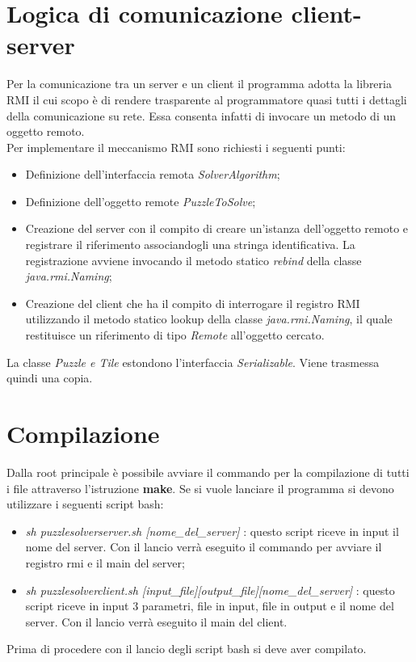 \documentclass[13pt]{article}
\begin{document}
\newpage
\section{Logica di comunicazione client-server}
Per la comunicazione tra un server e un client il programma adotta la libreria RMI il cui scopo è di rendere trasparente al programmatore quasi tutti i dettagli della comunicazione su rete. Essa consenta infatti di invocare un metodo di un oggetto remoto.\\
Per implementare il meccanismo RMI sono richiesti i seguenti punti:
\begin{itemize}
	\item Definizione dell'interfaccia remota \textit{SolverAlgorithm};
	\item Definizione dell'oggetto remote \textit{PuzzleToSolve};
	\item Creazione del server con il compito di creare un'istanza dell'oggetto remoto e registrare il riferimento associandogli una stringa identificativa. La registrazione avviene invocando il metodo statico \textit{rebind} della classe \textit{java.rmi.Naming};
	\item Creazione del client che ha il compito di interrogare il registro RMI utilizzando il metodo statico lookup della classe \textit{java.rmi.Naming}, il quale restituisce un riferimento di tipo \textit{Remote} all'oggetto cercato.
\end{itemize}
La classe \textit{Puzzle e Tile} estondono l'interfaccia \textit{Serializable}. Viene trasmessa quindi una copia.

\newpage
\section{Compilazione}
Dalla root principale è possibile avviare il commando per la compilazione di tutti i file attraverso l'istruzione \textbf{make}. Se si vuole lanciare il programma si devono utilizzare i seguenti script bash:
\begin{itemize}
	\item \textit{sh puzzlesolverserver.sh [nome\_del\_server]} : questo script riceve in input il nome del server. Con il lancio verrà eseguito il commando per avviare il registro rmi e il main del server;
	\item \textit{sh puzzlesolverclient.sh [input\_file][output\_file][nome\_del\_server]} : questo script riceve in input 3 parametri, file in input, file in output e il nome del server. Con il lancio verrà eseguito il main del client. 
\end{itemize}
Prima di procedere con il lancio degli script bash si deve aver compilato.
\end{document}
